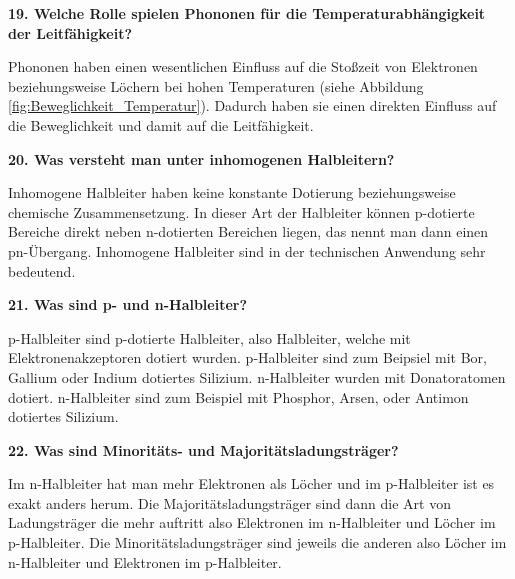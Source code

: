 \noindent\textbf{19. Welche Rolle spielen Phononen für die Temperaturabhängigkeit der Leitfähigkeit?}\\
\begin{addmargin}[25pt]{0pt}
Phononen haben einen wesentlichen Einfluss auf die Stoßzeit von Elektronen beziehungsweise Löchern bei hohen Temperaturen (siehe Abbildung \ref{fig:Beweglichkeit_Temperatur}). Dadurch haben sie einen direkten Einfluss auf die Beweglichkeit und damit auf die Leitfähigkeit.\\
\end{addmargin}

\noindent\textbf{20. Was versteht man unter inhomogenen Halbleitern?}\\
\begin{addmargin}[25pt]{0pt}
Inhomogene Halbleiter haben keine konstante Dotierung beziehungsweise chemische Zusammensetzung. In dieser Art der Halbleiter können p-dotierte Bereiche direkt neben n-dotierten Bereichen liegen, das nennt man dann einen pn-Übergang. Inhomogene Halbleiter sind in der technischen Anwendung sehr bedeutend.\\
\end{addmargin}

\noindent\textbf{21. Was sind p- und n-Halbleiter?}\\
\begin{addmargin}[25pt]{0pt}
p-Halbleiter sind p-dotierte Halbleiter, also Halbleiter, welche mit Elektronenakzeptoren dotiert wurden. p-Halbleiter sind zum Beipsiel mit Bor, Gallium oder Indium dotiertes Silizium. n-Halbleiter wurden mit Donatoratomen dotiert. n-Halbleiter sind zum Beispiel mit Phosphor, Arsen, oder Antimon dotiertes Silizium.\\
\end{addmargin}

\noindent\textbf{22. Was sind Minoritäts- und Majoritätsladungsträger?}\\
\begin{addmargin}[25pt]{0pt}
Im n-Halbleiter hat man mehr Elektronen als Löcher und im p-Halbleiter ist es exakt anders herum. Die Majoritätsladungsträger sind dann die Art von Ladungsträger die mehr auftritt also Elektronen im n-Halbleiter und Löcher im p-Halbleiter. Die Minoritätsladungsträger sind jeweils die anderen also Löcher im n-Halbleiter und Elektronen im p-Halbleiter.\\
\end{addmargin}

